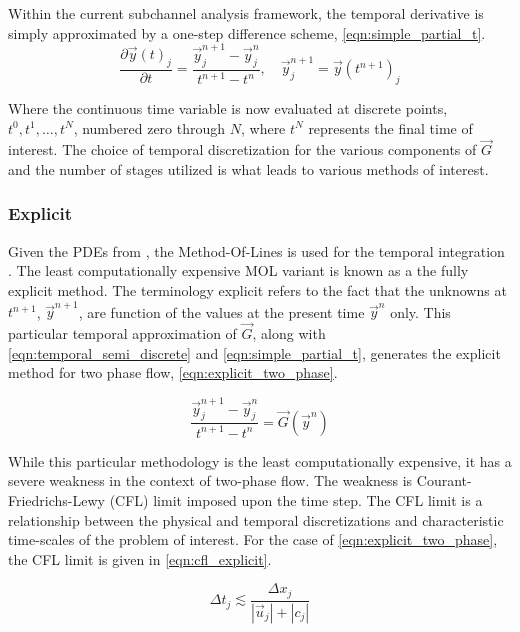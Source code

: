 Within the current subchannel analysis framework, the temporal derivative is simply approximated by a one-step difference scheme, \eqref{eqn:simple_partial_t}.
\begin{equation}
\label{eqn:simple_partial_t}
\frac{\partial \vec{y}(t)_j}{\partial t} = \frac{ \vec{y}^{n+1}_{j} - \vec{y}^{n}_{j}}{t^{n+1}-t^{n}}, \quad \vec{y}^{n+1}_j = \vec{y}(t^{n+1})_j
\end{equation}

Where the continuous time variable is now evaluated at discrete points, $t^0, t^1, \ldots, t^N$, numbered zero through $N$, where $t^N$ represents the final time of interest.
The choice of temporal discretization for the various components of $\vec{G}$ and the number of stages utilized is what leads to various methods of interest.

\subsubsection{Explicit}
\label{subsubsect:numerics_explicit}
Given the PDEs from , the Method-Of-Lines is used for the temporal integration \cite{LeVeque2007}.
The least computationally expensive MOL variant is known as a the fully explicit method.
The terminology explicit refers to the fact that the unknowns at $t^{n+1}$, $\vec{y}^{n+1}$, are function of the values at the present time $\vec{y}^{n}$ only.
This particular temporal approximation of $\vec{G}$, along with \eqref{eqn:temporal_semi_discrete} and \eqref{eqn:simple_partial_t}, generates the explicit method for two phase flow, \eqref{eqn:explicit_two_phase}.

\begin{equation}
\label{eqn:explicit_two_phase}
\frac{ \vec{y}^{n+1}_{j} - \vec{y}^{n}_{j}}{t^{n+1}-t^{n}} = \vec{G}(\vec{y}^{n})
\end{equation}

While this particular methodology is the least computationally expensive, it has a severe weakness in the context of two-phase flow.
The weakness is Courant-Friedrichs-Lewy (CFL) limit imposed upon the time step.
The CFL limit is a relationship between the physical and temporal discretizations and characteristic time-scales of the problem of interest.
For the case of \eqref{eqn:explicit_two_phase}, the CFL limit is given in \eqref{eqn:cfl_explicit}.

\begin{equation}
\label{eqn:cfl_explicit}
\Delta t_j \lesssim \frac{\Delta x_j}{|\vec{u}_j|+|c_j|}
\end{equation}

